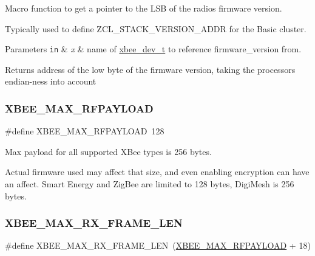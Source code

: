 Macro function to get a pointer to the L\+SB of the radio\textquotesingle{}s firmware version. 

Typically used to define Z\+C\+L\+\_\+\+S\+T\+A\+C\+K\+\_\+\+V\+E\+R\+S\+I\+O\+N\+\_\+\+A\+D\+DR for the Basic cluster.


\begin{DoxyParams}[1]{Parameters}
\mbox{\tt in}  & {\em x} & name of \hyperlink{structxbee__dev__t}{xbee\+\_\+dev\+\_\+t} to reference {\ttfamily firmware\+\_\+version} from.\\
\hline
\end{DoxyParams}
\begin{DoxyReturn}{Returns}
address of the low byte of the firmware version, taking the processor\textquotesingle{}s endian-\/ness into account 
\end{DoxyReturn}
\mbox{\label{group__xbee__device_gaea0dcde46961aae6f1cf5949be02d1a6}} 
\subsubsection{\texorpdfstring{X\+B\+E\+E\+\_\+\+M\+A\+X\+\_\+\+R\+F\+P\+A\+Y\+L\+O\+AD}{XBEE\_MAX\_RFPAYLOAD}}
{\footnotesize\ttfamily \#define X\+B\+E\+E\+\_\+\+M\+A\+X\+\_\+\+R\+F\+P\+A\+Y\+L\+O\+AD~128}



Max payload for all supported X\+Bee types is 256 bytes. 

Actual firmware used may affect that size, and even enabling encryption can have an affect. Smart Energy and Zig\+Bee are limited to 128 bytes, Digi\+Mesh is 256 bytes. \mbox{\label{group__xbee__device_gaefbbf0c7c5b7560f7137e5ff2cab4e45}} 
\subsubsection{\texorpdfstring{X\+B\+E\+E\+\_\+\+M\+A\+X\+\_\+\+R\+X\+\_\+\+F\+R\+A\+M\+E\+\_\+\+L\+EN}{XBEE\_MAX\_RX\_FRAME\_LEN}}
{\footnotesize\ttfamily \#define X\+B\+E\+E\+\_\+\+M\+A\+X\+\_\+\+R\+X\+\_\+\+F\+R\+A\+M\+E\+\_\+\+L\+EN~(\hyperlink{group__xbee__device_gaea0dcde46961aae6f1cf5949be02d1a6}{X\+B\+E\+E\+\_\+\+M\+A\+X\+\_\+\+R\+F\+P\+A\+Y\+L\+O\+AD} + 18)}



